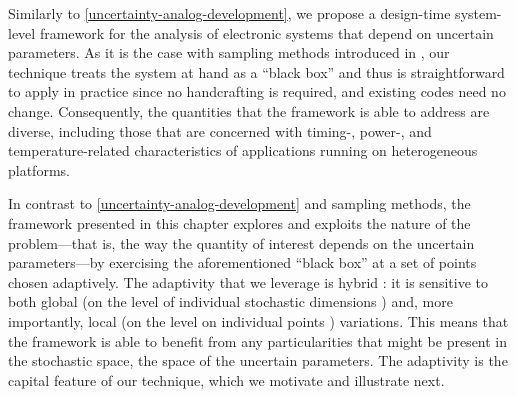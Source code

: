 Similarly to \cref{uncertainty-analog-development}, we propose a design-time
system-level framework for the analysis of electronic systems that depend on
uncertain parameters. As it is the case with sampling methods introduced in
, our technique treats the system at hand as a ``black box'' and thus
is straightforward to apply in practice since no handcrafting is required, and
existing codes need no change. Consequently, the quantities that the framework
is able to address are diverse, including those that are concerned with timing-,
power-, and temperature-related characteristics of applications running on
heterogeneous platforms.

In contrast to \cref{uncertainty-analog-development} and sampling methods, the
framework presented in this chapter explores and exploits the nature of the
problem---that is, the way the quantity of interest depends on the uncertain
parameters---by exercising the aforementioned ``black box'' at a set of points
chosen adaptively. The adaptivity that we leverage is hybrid \cite{jakeman2012}:
it is sensitive to both global (on the level of individual stochastic dimensions
\cite{klimke2006}) and, more importantly, local (on the level on individual
points \cite{ma2009}) variations. This means that the framework is able to
benefit from any particularities that might be present in the stochastic space,
the space of the uncertain parameters. The adaptivity is the capital feature of
our technique, which we motivate and illustrate next.
